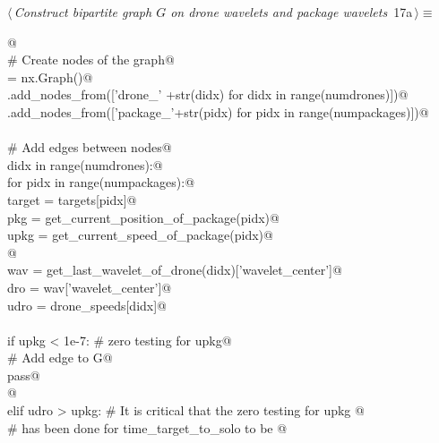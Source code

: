 \documentclass[10pt, english, oneside]{report}
\begin{document}
\begin{flushleft} \small
\begin{minipage}{\linewidth}\label{scrap16}\raggedright\small
{} $\langle\,${\itshape Construct bipartite graph $G$ on drone wavelets and package wavelets}\nobreak\ {\footnotesize {17a}}$\,\rangle\equiv$
\vspace{-1ex}
\begin{list}{}{} \item
\mbox{}\verb@   @\\
\mbox{}\verb@# Create nodes of the graph@\\
\mbox{}\verb@G = nx.Graph()@\\
\mbox{}\verb@G.add_nodes_from(['drone_'  +str(didx) for didx in range(numdrones)])@\\
\mbox{}\verb@G.add_nodes_from(['package_'+str(pidx) for pidx in range(numpackages)])@\\
\mbox{}\verb@@\\
\mbox{}\verb@# Add edges between nodes@\\
\mbox{}\verb@for didx in range(numdrones):@\\
\mbox{}\verb@    for pidx in range(numpackages):@\\
\mbox{}\verb@         target = targets[pidx]@\\
\mbox{}\verb@         pkg    = get_current_position_of_package(pidx)@\\
\mbox{}\verb@         upkg   = get_current_speed_of_package(pidx)@\\
\mbox{}\verb@    @\\
\mbox{}\verb@         wav    = get_last_wavelet_of_drone(didx)['wavelet_center']@\\
\mbox{}\verb@         dro    = wav['wavelet_center']@\\
\mbox{}\verb@         udro   = drone_speeds[didx]@\\
\mbox{}\verb@@\\
\mbox{}\verb@          if upkg < 1e-7: # zero testing for upkg@\\
\mbox{}\verb@             # Add edge to G@\\
\mbox{}\verb@             pass@\\
\mbox{}\verb@ @\\
\mbox{}\verb@          elif udro > upkg: # It is critical that the zero testing for upkg @\\
\mbox{}\verb@                            # has been done for time_target_to_solo to be @\\

\end{list}
\end{minipage}
\end{flushleft}
\end{document}
